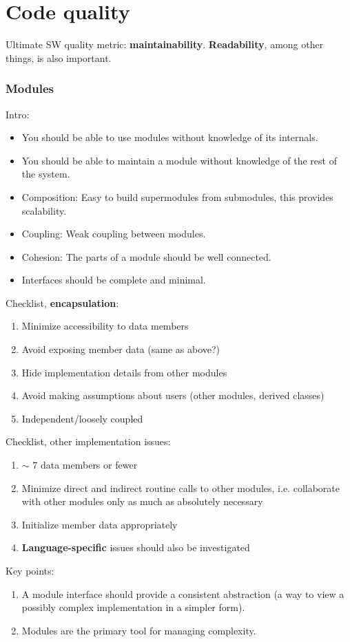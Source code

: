 \part{Code quality}
Ultimate SW quality metric: \textbf{maintainability}. \textbf{Readability}, among other things, is also important. 
\section{Modules}
Intro:
\begin{itemize}
    \item You should be able to use modules without knowledge of its internals.
    \item You should be able to maintain a module without knowledge of the rest of the system.
    \item Composition: Easy to build supermodules from submodules, this provides scalability.
    \item Coupling: Weak coupling between modules.
    \item Cohesion: The parts of a module should be well connected. 
    \item Interfaces should be complete and minimal.
\end{itemize}
Checklist, \textbf{encapsulation}:
\begin{enumerate}
    \item Minimize accessibility to data members
    \item Avoid exposing member data (same as above?)
    \item Hide implementation details from other modules
    \item Avoid making assumptions about users (other modules, derived classes)
    \item Independent/loosely coupled
\end{enumerate}
Checklist, other implementation issues:
\begin{enumerate}
    \item $\sim$ 7 data members or fewer
    \item Minimize direct and indirect routine calls to other modules, i.e. collaborate with other modules only as much as absolutely necessary
    \item Initialize member data appropriately
    \item \textbf{Language-specific} issues should also be investigated
\end{enumerate}
Key points:
\begin{enumerate}
    \item A module interface should provide a consistent abstraction (a way to view a possibly complex implementation in a simpler form).
    \item Modules are the primary tool for managing complexity.
\end{enumerate}

